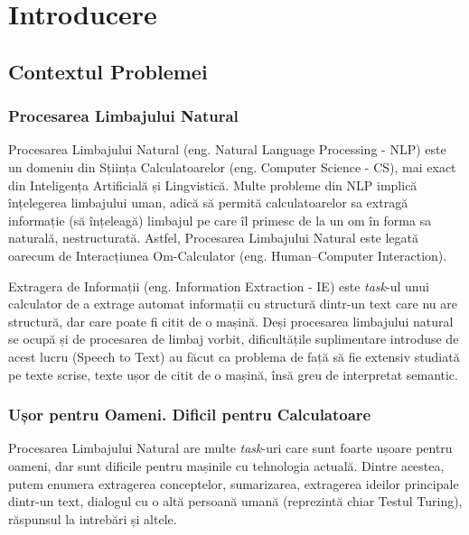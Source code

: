 \chapter{Introducere}
\label{chapter:intro}

\section{Contextul Problemei}

\subsection{Procesarea Limbajului Natural}


Procesarea Limbajului Natural (eng. Natural Language Processing - NLP) este un domeniu din Sțiința Calculatoarelor (eng. Computer Science - CS), mai exact din Inteligența Artificială și Lingvistică. Multe probleme din NLP implică înțelegerea limbajului uman, adică să permită calculatoarelor sa extragă informație (să înțeleagă) limbajul pe care îl primesc de la un om în forma sa naturală, nestructurată. Astfel, Procesarea Limbajului Natural este legată oarecum de Interacțiunea Om-Calculator (eng. Human–Computer Interaction).


Extragera de Informații (eng. Information Extraction - IE) este \textit{task}-ul unui calculator de a extrage automat informații cu structură dintr-un text care nu are structură, dar care poate fi citit de o mașină. Deși procesarea limbajului natural se ocupă și de procesarea de limbaj vorbit, dificultățile suplimentare introduse de acest lucru (Speech to Text) au făcut ca problema de față să fie extensiv studiată pe texte scrise, texte ușor de citit de o mașină, însă greu de interpretat semantic.


\subsection{Ușor pentru Oameni. Dificil pentru Calculatoare}

Procesarea Limbajului Natural are multe \textit{task}-uri care sunt foarte ușoare pentru oameni, dar sunt dificile pentru mașinile cu tehnologia actuală. Dintre acestea, putem enumera extragerea conceptelor, sumarizarea, extragerea ideilor principale dintr-un text, dialogul cu o altă persoană umană (reprezintă chiar Testul Turing), răspunsul la intrebări și altele.

